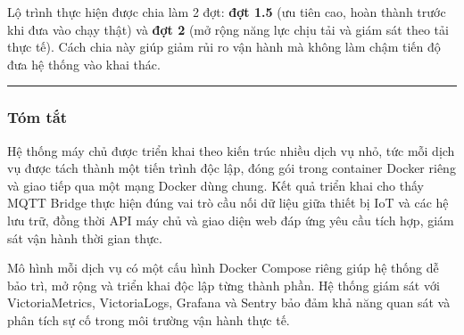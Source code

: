 \documentclass[a4paper]{extarticle}
\begin{document}
Lộ trình thực hiện được chia làm 2 đợt: \textbf{đợt 1.5} (ưu tiên cao,
hoàn thành trước khi đưa vào chạy thật) và \textbf{đợt 2} (mở rộng năng lực
chịu tải và giám sát theo tải thực tế). Cách chia này giúp giảm rủi ro
vận hành mà không làm chậm tiến độ đưa hệ thống vào khai thác.

\begin{center}\rule{0.5\linewidth}{0.5pt}\end{center}

\subsubsection{Tóm tắt}\label{tuxf3m-tux1eaft}

Hệ thống máy chủ được triển khai theo kiến trúc nhiều dịch vụ nhỏ, tức mỗi
dịch vụ được tách thành một tiến trình độc lập, đóng gói trong container
Docker riêng và giao tiếp
qua một mạng Docker dùng chung. Kết quả triển khai cho thấy
MQTT Bridge thực hiện đúng vai trò cầu nối dữ liệu giữa thiết bị IoT và
các hệ lưu trữ, đồng thời API máy chủ và giao diện web đáp ứng yêu
cầu tích hợp, giám sát vận hành thời gian thực.

Mô hình mỗi dịch vụ có một cấu hình Docker Compose riêng giúp hệ thống dễ bảo
trì, mở rộng và triển khai độc lập từng thành phần. Hệ thống giám sát
với VictoriaMetrics, VictoriaLogs, Grafana và Sentry bảo đảm khả năng
quan sát và phân tích sự cố trong môi trường vận hành thực tế.
\end{document}
